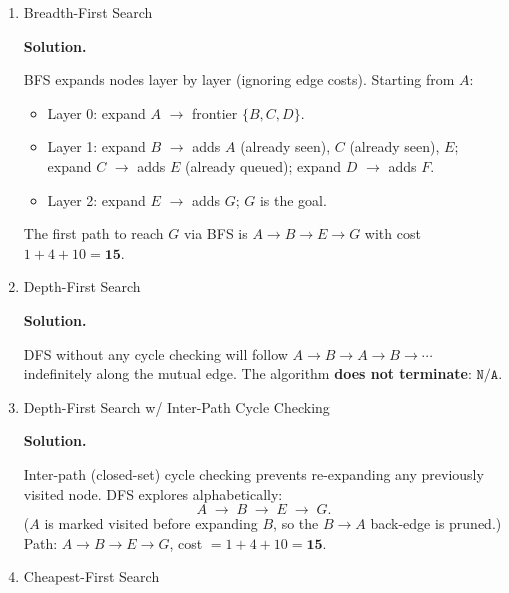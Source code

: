 \documentclass[12pt]{article}
\newenvironment{solution}{%
  \ifshowsolutions\begin{solutionbox}\noindent\textbf{\color{blue!70!black}Solution.}\quad\fi
  \ifshowsolutions\else\expandafter\comment\fi
}{%
  \ifshowsolutions\end{solutionbox}\fi
  \ifshowsolutions\else\expandafter\endcomment\fi
}
\begin{document}
\begin{enumerate}
\begin{enumerate}
\item Breadth-First Search

\begin{solution}
  BFS expands nodes layer by layer (ignoring edge costs). Starting from $A$:
  \begin{itemize}
    \item Layer 0: expand $A$ $\to$ frontier $\{B, C, D\}$.
    \item Layer 1: expand $B$ $\to$ adds $A$ (already seen), $C$ (already seen), $E$; expand $C$ $\to$ adds $E$ (already queued); expand $D$ $\to$ adds $F$.
    \item Layer 2: expand $E$ $\to$ adds $G$; $G$ is the goal.
  \end{itemize}
  The first path to reach $G$ via BFS is $A \to B \to E \to G$ with cost $1+4+10 = \mathbf{15}$.
\end{solution}

\item Depth-First Search

\begin{solution}
  DFS without any cycle checking will follow $A \to B \to A \to B \to \cdots$ indefinitely along the mutual edge. The algorithm \textbf{does not terminate}: $\texttt{N/A}$.
\end{solution}

\item Depth-First Search w/ Inter-Path Cycle Checking

\begin{solution}
  Inter-path (closed-set) cycle checking prevents re-expanding any previously visited node. DFS explores alphabetically:
  \[
    A \;\to\; B \;\to\; E \;\to\; G.
  \]
  ($A$ is marked visited before expanding $B$, so the $B\to A$ back-edge is pruned.) Path: $A \to B \to E \to G$, cost $= 1+4+10 = \mathbf{15}$.
\end{solution}

\item Cheapest-First Search


\end{enumerate}
\end{enumerate}
\end{document}
